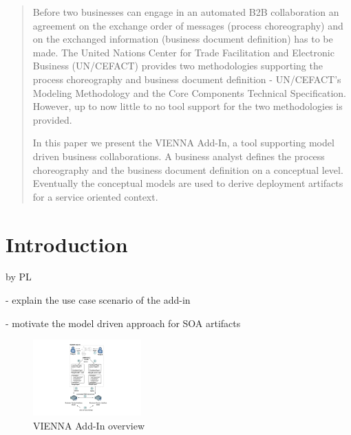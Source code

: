 \documentclass{acm_proc_article-sp}
\begin{document}
\maketitle
\begin{abstract}



Before two businesses can engage in an automated B2B collaboration an agreement on the exchange order of messages (process choreography) and on the exchanged information (business document definition) has to be made. The United Nations Center for Trade Facilitation and Electronic Business (UN/CEFACT) provides two methodologies supporting the process choreography and business document definition - UN/CEFACT's Modeling Methodology and the Core Components Technical Specification. However, up to now little to no tool support for the two methodologies is provided.

In this paper we present the VIENNA Add-In, a tool supporting model driven business collaborations. A business analyst defines the process choreography and the business document definition on a conceptual level. Eventually the conceptual models are used to derive deployment artifacts for a service oriented context.








\end{abstract}







\section{Introduction} by PL

- explain the use case scenario of the add-in

- motivate the model driven approach for SOA artifacts


\begin{figure}
 \centering
   \includegraphics[width=0.37\textwidth]{figures/addinoverview.pdf}
 \caption{VIENNA Add-In overview}
 \label{fig:viennaaddinoverview}
\end{figure}
\end{document}
